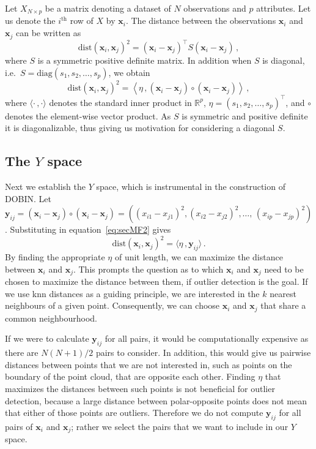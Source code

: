 \documentclass[a4paper,12pt]{article}
\newcommand{\dist}{\text{dist}}
\newcommand{\diag}{\text{diag}}
\begin{document}
Let $X_{N \times p}$ be a matrix denoting a dataset of $N$ observations and $p$ attributes. Let us denote the $i^{\text{th}}$ row of $X$ by $\bm{x}_i$. The distance between the observations $\bm{x}_i$ and $\bm{x}_j$ can be written as
\begin{equation}\label{eq:secMF1}
	\dist(\bm{x}_i, \bm{x}_j)^2 = ( \bm{x}_i - \bm{x}_j)^\top S ( \bm{x}_i - \bm{x}_j ) \, ,
\end{equation}
where $S$ is a symmetric positive definite matrix. In addition when $S$ is diagonal, i.e.\ $S = \diag(s_1, s_2, \dots, s_p)$, we obtain
\begin{equation}\label{eq:secMF2}
	\dist(\bm{x}_i, \bm{x}_j)^2 = \left\langle \eta\, , ( \bm{x}_i - \bm{x}_j )\circ ( \bm{x}_i - \bm{x}_j ) \right\rangle \,,
\end{equation}
where $\langle \cdot\, , \cdot \rangle$ denotes the standard inner product in $\mathbb{R}^p$, $\eta = (s_1, s_2, \dots, s_p)^\top$, and $\circ$ denotes the element-wise vector product. As $S$ is symmetric and positive definite it is diagonalizable, thus giving us motivation for considering a diagonal $S$.

\subsection{The $Y$ space}\label{sec:MathFrame1}

Next we establish the $Y$ space, which is instrumental in the construction of DOBIN\@. Let $\bm{y}_{ij} = ( \bm{x}_i - \bm{x}_j )\circ ( \bm{x}_i - \bm{x}_j ) = \left( ( x_{i1} - x_{j1} )^2, ( x_{i2} - x_{j2} )^2, \dots, \, ( x_{ip} - x_{jp} )^2 \right)$. Substituting in equation~\eqref{eq:secMF2} gives
\begin{equation}\label{eq:secMF3}
	\dist(\bm{x}_i, \bm{x}_j)^2 = \langle \eta\, , \bm{y}_{ij} \rangle\, .
\end{equation}
By finding the appropriate $\eta$ of unit length, we can maximize the distance between $\bm{x}_i$ and $\bm{x}_j$. This prompts the question as to which $\bm{x}_i$ and $\bm{x}_j$ need to be chosen to maximize the distance between them, if outlier detection is the goal. If we use knn distances as a guiding principle, we are interested in the $k$ nearest neighbours of a given point. Consequently, we can choose $\bm{x}_i$ and $\bm{x}_j$ that share a common neighbourhood.

If we were to calculate $\bm{y}_{ij}$ for all pairs, it would be computationally expensive as there are $N(N+1)/2$ pairs to consider. In addition, this would give us pairwise distances between points that we are not interested in, such as points on the boundary of the point cloud, that are opposite each other. Finding $\eta$ that maximizes the distances between such points is not beneficial for outlier detection, because a large distance between polar-opposite points does not mean that either of those points are outliers. Therefore we do not compute $\bm{y}_{ij}$ for all pairs of $\bm{x}_i$ and $\bm{x}_j$; rather we select the pairs that we want to include in our $Y$ space.
\end{document}
